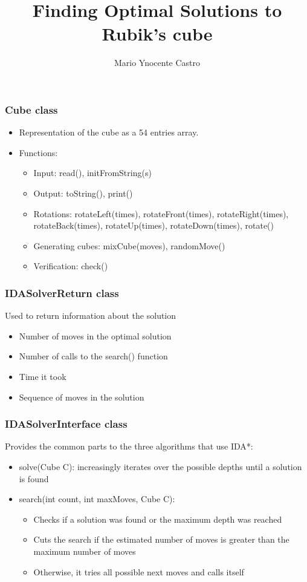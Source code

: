 \documentclass{beamer}
\title{Finding Optimal Solutions to Rubik's cube}
\author{Mario Ynocente Castro}
\institute{Ecole polytechnique}
\begin{document}
\begin{frame}
\titlepage
\end{frame}

\begin{frame}
\frametitle{Cube class}

\begin{itemize}
\item
Representation of the cube as a 54 entries array.

\item
Functions:

\begin{itemize}
\item
Input: read(), initFromString(s)
\item
Output: toString(), print()
\item
Rotations: rotateLeft(times), rotateFront(times), rotateRight(times), rotateBack(times), rotateUp(times), rotateDown(times), rotate()
\item
Generating cubes: mixCube(moves), randomMove()
\item
Verification: check()
\end{itemize}

\end{itemize}

\end{frame}

\begin{frame}
\frametitle{IDASolverReturn class}

Used to return information about the solution

\begin{itemize}
\item
Number of moves in the optimal solution
\item
Number of calls to the search() function
\item
Time it took
\item
Sequence of moves in the solution
\end{itemize}
\end{frame}

\begin{frame}
\frametitle{IDASolverInterface class}

Provides the common parts to the three algorithms that use IDA*:

\begin{itemize}
\item
solve(Cube C): increasingly iterates over the possible depths until a solution is found
\item
search(int count, int maxMoves, Cube C):

\begin{itemize}
\item
Checks if a solution was found or the maximum depth was reached
\item
Cuts the search if the estimated number of moves is greater than the maximum number of moves
\item
Otherwise, it tries all possible next moves and calls itself
\end{itemize}
\end{itemize}
\end{frame}
\end{document}
